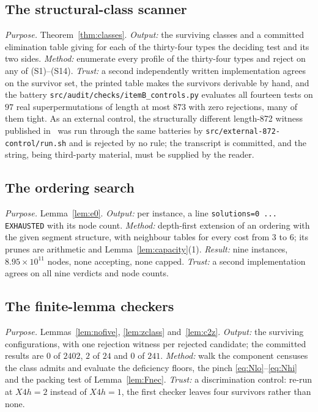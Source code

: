 \documentclass[10pt]{article}
\theoremstyle{remark}
\theoremstyle{plain}
\newcommand{\prog}[1]{\texttt{#1}}
\begin{document}
\subsection{The structural-class scanner}\label{sub:scanner}

\emph{Purpose.}  Theorem~\ref{thm:classes}.  \emph{Output:} the
surviving classes and a committed elimination table giving for each of
the thirty-four types the deciding test and its two sides.
\emph{Method:} enumerate every profile of the thirty-four types and
reject on any of (S1)--(S14).  \emph{Trust:} a second independently written implementation agrees on
the survivor set, the printed table makes the survivors derivable by
hand, and the battery
\prog{src/\allowbreak audit/\allowbreak checks/\allowbreak itemB\_controls.py}
evaluates all fourteen tests on $97$ real superpermutations of length
at most $873$ with zero rejections, many of them tight.  As an
external control, the structurally different length-872 witness
published in~\cite{A6872repo} was run through the same batteries by
\prog{src/\allowbreak external-872-control/\allowbreak run.sh} and is
rejected by no rule; the transcript is committed, and the string,
being third-party material, must be supplied by the reader.

\subsection{The ordering search}\label{sub:ordering}

\emph{Purpose.}  Lemma~\ref{lem:e0}.  \emph{Output:} per instance, a
line \prog{solutions=0 ... EXHAUSTED} with its node count.
\emph{Method:} depth-first extension of an
ordering with the given segment structure, with neighbour tables for
every cost from $3$ to $6$; its prunes are arithmetic and
Lemma~\ref{lem:capacity}(1).  \emph{Result:}
nine instances, $8.95\times10^{11}$ nodes, none accepting, none capped.
\emph{Trust:} a second implementation agrees on all nine verdicts and
node counts.

\subsection{The finite-lemma checkers}\label{sub:finlem}

\emph{Purpose.}  Lemmas~\ref{lem:nofive}, \ref{lem:zclass}
and~\ref{lem:c2z}.  \emph{Output:} the surviving configurations, with
one rejection witness per rejected candidate; the committed results
are $0$ of $2402$, $2$ of $24$ and $0$ of $241$.  \emph{Method:} walk the component censuses the class admits and
evaluate the deficiency floors, the pinch \eqref{eq:Nlo}--\eqref{eq:Nhi}
and the packing test of Lemma~\ref{lem:Fnec}.  \emph{Trust:} a
discrimination control: re-run at $X4h=2$ instead of $X4h=1$, the
first checker leaves four survivors rather than none.
\end{document}
